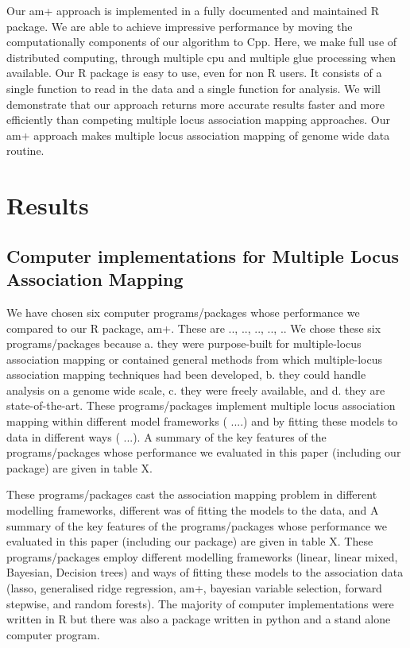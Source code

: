 \documentclass{article}
\begin{document}
Our am+ approach is implemented in a fully documented and maintained R package. 
We are able to achieve impressive performance by moving the computationally 
components of our algorithm to Cpp. Here, we make full use of distributed 
computing, through multiple cpu and multiple glue processing when available. 
Our R package is easy to use, even for non  R users. It consists of a single function
 to read in the data and a single function for analysis. We will demonstrate that 
 our approach returns more accurate results faster and more efficiently than 
 competing multiple locus association mapping approaches. Our am+ approach 
 makes multiple locus association mapping of genome wide data routine.

\section{Results}

\subsection{Computer implementations for Multiple Locus Association Mapping}



We have chosen six computer programs/packages whose performance we  compared  to our R package, am+. These are .., .., .., .., .. We chose these six programs/packages because a. they were purpose-built for multiple-locus association mapping or contained general methods from which multiple-locus association mapping techniques had been developed, b. they could handle analysis on a genome wide scale, c.  they were freely available, and d. they are state-of-the-art.  These programs/packages implement multiple locus association mapping within different model frameworks ( ....) and by fitting these models to data in different ways ( ...). 
A summary of the key features of the programs/packages whose performance we evaluated in this paper (including our package) are given in table X.


These programs/packages cast the association mapping problem in different modelling frameworks, different was of fitting the models to the data, and 
A summary of the key features of the programs/packages whose performance we evaluated in this paper (including our package) are given in table X.  These programs/packages employ different modelling frameworks (linear, linear mixed, Bayesian, Decision trees) and ways of fitting these models to the association data (lasso, generalised ridge regression, am+, bayesian variable selection, forward stepwise, and random forests). The majority of computer implementations were written in R but there was also a package written in python and a stand alone computer program. 
\end{document}
